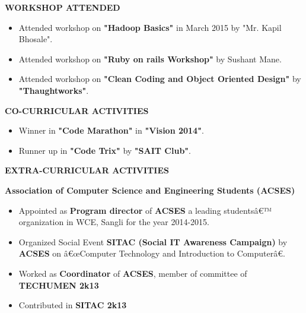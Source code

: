 \documentclass{article}
\begin{document}
\vspace{1cm}
\begin{framed}
	\large{\textbf{WORKSHOP ATTENDED}}
\end{framed}

\begin{itemize}
	\item Attended workshop on \textbf{"Hadoop Basics"} in March 2015 by "Mr. Kapil Bhosale".
	\item Attended workshop on \textbf{"Ruby on rails Workshop"} by Sushant Mane.
	\item Attended workshop on \textbf{"Clean Coding and Object Oriented Design"} by \textbf{"Thaughtworks"}. 
\end{itemize}


\vspace{1cm}
\begin{framed}
	\large{\textbf{CO-CURRICULAR ACTIVITIES}}
\end{framed}
\begin{itemize}
	\item Winner in \textbf{"Code Marathon"} in \textbf{"Vision 2014"}.
	\item Runner up in \textbf{"Code Trix"}  by \textbf{ "SAIT Club"}.
\end{itemize}



\vspace{1cm}

\begin{framed}
	\large{\textbf{EXTRA-CURRICULAR ACTIVITIES}}
\end{framed}

\textbf{Association of Computer Science and Engineering Students (ACSES)}
\begin{itemize}	
	\item Appointed as \textbf{Program director} of \textbf{ACSES} a leading studentsâ€™ organization in WCE, Sangli for the year 2014-2015.
	\item Organized Social Event \textbf{SITAC (Social IT Awareness Campaign)} by \textbf{ACSES} on â€œComputer Technology and Introduction to Computerâ€.
	\item Worked as \textbf{Coordinator} of \textbf{ACSES}, member of committee of \textbf{TECHUMEN 2k13}
	\item Contributed in \textbf{SITAC 2k13}
	
\end{itemize}
\end{document}
